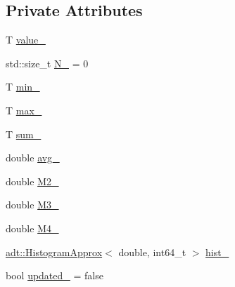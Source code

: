 \subsection*{Private Attributes}
\begin{DoxyCompactItemize}
\item 
T \hyperlink{structvt_1_1runtime_1_1component_1_1detail_1_1_diagnostic_value_wrapper_a0c675d645decffc3484ce8ab75a18f8b}{value\+\_\+}
\item 
std\+::size\+\_\+t \hyperlink{structvt_1_1runtime_1_1component_1_1detail_1_1_diagnostic_value_wrapper_a8055733259d06927a4c3e02e0d1649e4}{N\+\_\+} = 0
\item 
T \hyperlink{structvt_1_1runtime_1_1component_1_1detail_1_1_diagnostic_value_wrapper_ab68e4198cf0512a06af2e75d0a4837a4}{min\+\_\+}
\item 
T \hyperlink{structvt_1_1runtime_1_1component_1_1detail_1_1_diagnostic_value_wrapper_a2db654ff7822440abfe2ef0b1dd1958a}{max\+\_\+}
\item 
T \hyperlink{structvt_1_1runtime_1_1component_1_1detail_1_1_diagnostic_value_wrapper_afc3afcf348de09544bf109097224b7eb}{sum\+\_\+}
\item 
double \hyperlink{structvt_1_1runtime_1_1component_1_1detail_1_1_diagnostic_value_wrapper_af43c732f760bdc64bb3d893e3aa900b6}{avg\+\_\+}
\item 
double \hyperlink{structvt_1_1runtime_1_1component_1_1detail_1_1_diagnostic_value_wrapper_af76d6679a75ff42618eabd6ae844e18e}{M2\+\_\+}
\item 
double \hyperlink{structvt_1_1runtime_1_1component_1_1detail_1_1_diagnostic_value_wrapper_a53e9c5563eb7a716f755536de3cc410d}{M3\+\_\+}
\item 
double \hyperlink{structvt_1_1runtime_1_1component_1_1detail_1_1_diagnostic_value_wrapper_af7e886c6de25a8dfe72eb607bcd61d11}{M4\+\_\+}
\item 
\hyperlink{namespacevt_1_1adt_a486971e142bc22434d6afe695c43b599}{adt\+::\+Histogram\+Approx}$<$ double, int64\+\_\+t $>$ \hyperlink{structvt_1_1runtime_1_1component_1_1detail_1_1_diagnostic_value_wrapper_af507930d714b3665233a19ef93fc6d32}{hist\+\_\+}
\item 
bool \hyperlink{structvt_1_1runtime_1_1component_1_1detail_1_1_diagnostic_value_wrapper_a4b844fd84acb8f1e1f9b2055f2f7b8bf}{updated\+\_\+} = false
\end{DoxyCompactItemize}
